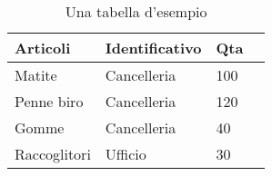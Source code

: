 \begin{table}[h!]
\centering
\begin{tabular}{|l|l|l|l|}
\hline
Articoli      & Identificativo & Qta \\ \hline
Matite        & Cancelleria    & 100 \\ \hline
Penne biro    & Cancelleria    & 120 \\ \hline
Gomme         & Cancelleria    & 40  \\ \hline
Raccoglitori  & Ufficio        & 30  \\ \hline
\end{tabular}
\caption{Una tabella d'esempio}
\end{table}
